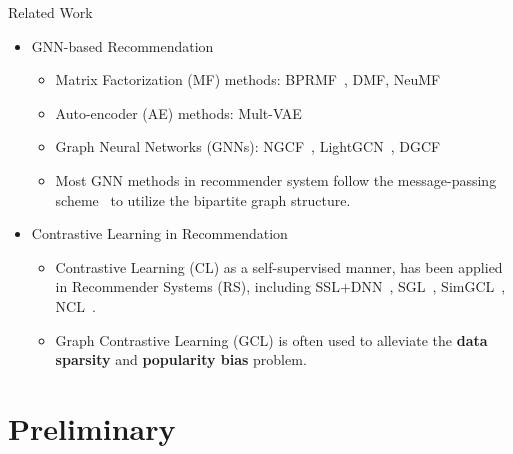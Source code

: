 \documentclass[t]{beamer}
\begin{document}
\begin{frame}{Related Work}
\begin{itemize}
    \item GNN-based  Recommendation
    \begin{itemize}
        \item Matrix Factorization (MF) methods: BPRMF~, DMF, NeuMF 
        \item Auto-encoder (AE) methods: Mult-VAE
        \item Graph Neural Networks (GNNs): NGCF~, LightGCN~, DGCF~
        \item Most GNN methods in recommender system follow the message-passing scheme~ to utilize the bipartite graph structure.
    \end{itemize}
    \item Contrastive Learning in Recommendation
    \begin{itemize}
        \item Contrastive Learning (CL) as a self-supervised manner, has been applied in Recommender Systems (RS), including SSL+DNN~, SGL~, SimGCL~, NCL~.
        \item Graph Contrastive Learning (GCL) is often used to alleviate the \textbf{data sparsity}  and \textbf{popularity bias} problem.
    \end{itemize}
\end{itemize}
    
\end{frame}


\section{Preliminary}
\label{sec:preliminary}
\end{document}
